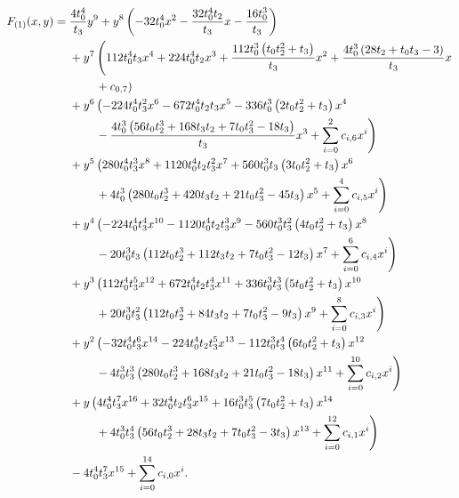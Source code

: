 \begin{align}
    \label{curve:dilute_fixed}
    F_{(1)}(x,y)={} & \frac{4 t_0^4}{t_3}y^{9}{}+y^{8}\left(-32 t_0^4x^{2} - \frac{32 t_0^4 t_2}{t_3}x - \frac{16 t_0^3}{t_3}\right)\notag \\
                    & {}+y^{7}\left(112 t_0^4 t_3x^{4} + 224 t_0^4 t_2x^{3} + \frac{112 t_0^3 \left(t_0 t_2^2+t_3\right)}{t_3}x^{2} + \frac{4 t_0^3 \left(28 t_2+t_0 t_3-3\right)}{t_3}x\right.\notag \\*
                    & \qquad{}\left.{}+ c_{0,7}\right)\notag \\
                    & {}+y^{6}\left(-224 t_0^4 t_3^2x^{6} - 672 t_0^4 t_2 t_3x^{5} - 336 t_0^3 \left(2 t_0 t_2^2+t_3\right)x^{4}\right.\notag \\*
                    & \qquad{}\left.{}- \frac{4 t_0^3 \left(56 t_0 t_2^3+168 t_3 t_2+7 t_0 t_3^2-18 t_3\right)}{t_3}x^{3} + \sum_{i=0}^{2}c_{i,6}x^i\right)\notag \\
                    & {}+y^{5}\left(280 t_0^4 t_3^3x^{8} + 1120 t_0^4 t_2 t_3^2x^{7} + 560 t_0^3 t_3 \left(3 t_0 t_2^2+t_3\right)x^{6}\right.\notag \\*
                    & \qquad{}\left.{}+ 4 t_0^3 \left(280 t_0 t_2^3+420 t_3 t_2+21 t_0 t_3^2-45 t_3\right)x^{5} + \sum_{i=0}^{4}c_{i,5}x^i\right)\notag \\
                    & {}+y^{4}\left(-224 t_0^4 t_3^4x^{10} - 1120 t_0^4 t_2 t_3^3x^{9} - 560 t_0^3 t_3^2 \left(4 t_0 t_2^2+t_3\right)x^{8}\right.\notag \\*
                    & \qquad{}\left.{}- 20 t_0^3 t_3 \left(112 t_0 t_2^3+112 t_3 t_2+7 t_0 t_3^2-12 t_3\right)x^{7} + \sum_{i=0}^{6}c_{i,4}x^i\right)\notag \\
                    & {}+y^{3}\left(112 t_0^4 t_3^5x^{12} + 672 t_0^4 t_2 t_3^4x^{11} + 336 t_0^3 t_3^3 \left(5 t_0 t_2^2+t_3\right)x^{10}\right.\notag \\*
                    & \qquad{}\left.{}+ 20 t_0^3 t_3^2 \left(112 t_0 t_2^3+84 t_3 t_2+7 t_0 t_3^2-9 t_3\right)x^{9} + \sum_{i=0}^{8}c_{i,3}x^i\right)\notag \\
                    & {}+y^{2}\left(-32 t_0^4 t_3^6x^{14} - 224 t_0^4 t_2 t_3^5x^{13} - 112 t_0^3 t_3^4 \left(6 t_0 t_2^2+t_3\right)x^{12}\right.\notag \\*
                    & \qquad{}\left.{}- 4 t_0^3 t_3^3 \left(280 t_0 t_2^3+168 t_3 t_2+21 t_0 t_3^2-18 t_3\right)x^{11} + \sum_{i=0}^{10}c_{i,2}x^i\right)\notag \\
                    & {}+y\left(4 t_0^4 t_3^7x^{16} + 32 t_0^4 t_2 t_3^6x^{15} + 16 t_0^3 t_3^5 \left(7 t_0 t_2^2+t_3\right)x^{14}\right.\notag \\*
                    & \qquad{}\left.{}+ 4 t_0^3 t_3^4 \left(56 t_0 t_2^3+28 t_3 t_2+7 t_0 t_3^2-3 t_3\right)x^{13} + \sum_{i=0}^{12}c_{i,1}x^i\right)\notag \\
                    & {}-4 t_0^4 t_3^7x^{15} + \sum_{i=0}^{14}c_{i,0}x^i.
\end{align}
